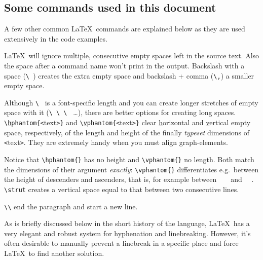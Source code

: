 \documentclass[a4paper,justified]{tufte-handout}
\begin{document}
\subsection{\hspace*{-8pt}Some commands used in this document}
A few other common \LaTeX\ commands are explained below as they are used extensively in the code examples.

 \LaTeX\ will ignore multiple, consecutive empty spaces left in the source text. Also the space after a command name won't print in the output. Backslash with a space (\verb*|\ |) creates the extra empty space and backslash + comma (\verb|\,|) a smaller empty space.

Although \verb*|\ | is a font-specific length and you can create longer stretches of empty space with it (\verb*|\ \ \ | \dots ), there are better options for creating long spaces. \verb|\|\texttt{\uline{h}}\verb|phantom{<|{\Fontauri text}\verb|>}| and \verb|\|\texttt{\uline{v}}\verb|phantom{<|{\Fontauri text}\verb|>}| clear \uline{h}orizontal and \uline{v}ertical empty space, respectively, of the length and height of the finally \textit{typeset} dimensions of \verb|<|{\Fontauri text}\verb|>|. They are extremely handy when you must align graph-elements.

Notice that \verb|\hphantom{}| has no height and \verb|\vphantom{}| no length. Both match the dimensions of their argument \textit{exactly}: \verb|\vphantom{}| differentiates  e.g.\ between the height of descenders and ascenders, that is, for example between%
 \  \ %
and%
 \ ~. \verb|\strut| creates a vertical space equal to that between two consecutive lines.

 \verb|\\| end the paragraph and start a new line.

As is briefly discussed below in the short history of the language, \LaTeX\ has a very elegant and robust system for hyphenation and linebreaking. However, it's often desirable to manually prevent a linebreak in a specific place and force \LaTeX\ to find another solution.
\end{document}
